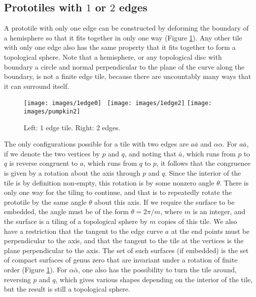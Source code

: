 \documentclass[11pt]{amsart}
\theoremstyle{remark}
\begin{document}
\subsection{Prototiles with $1$ or $2$ edges}
A prototile with only one edge can be constructed by deforming the boundary of a hemisphere so that it fits together in only one way (Figure \ref{fig:twoedge}).   Any other tile with only one edge also has the same property that it fits together to form a topological sphere.
Note that a hemisphere, or any topological disc with boundary a circle and normal perpendicular to the plane of the curve along the boundary, is not a finite edge tile, because there are uncountably many ways that it can surround itself.

\begin{figure}[h!tbp]
	\begin{center}
		\texttt{[image: images/1edge0]}  \,
		\texttt{[image: images/1edge2]}  \quad \quad \quad\quad
		\texttt{[image: images/pumpkin2]} 
		\end{center}
	\caption{Left: 1 edge tile.  Right: 2 edges. }
	\label{fig:twoedge}
\end{figure}
The only configurations possible for a tile with two edges are $a \bar a$ and $\alpha \alpha$.
For $a \bar a$, if we denote the two vertices by $p$ and $q$,  and noting that $\bar a$, which runs
from $p$ to $q$ is reverse congruent to $a$, which runs from $q$ to $p$, it follows that the congruence is given 
by a rotation about the axis through $p$ and $q$.  Since the interior of the tile is by definition non-empty, this rotation is by some nonzero angle $\theta$.  There is only one way for the tiling to continue, and that is to repeatedly
rotate the prototile by the same angle $\theta$ about this axis.  If we require the surface to be embedded,
the angle must be of the form $\theta = 2\pi/m$, where $m$ is an integer, and the surface is a tiling of a topological
sphere by $m$ copies of this tile. We also have a restriction that the tangent to the edge curve $a$ at the end points must be perpendicular to the axis, and that the tangent to the tile at the vertices is the plane perpendicular to the axis.  The set of such surfaces (if embedded) is the set of compact surfaces of genus zero that are invariant under a  rotation of finite order (Figure \ref{fig:twoedge}). For $\alpha \bar \alpha$, one also has the possibility to turn the tile around, reversing $p$ and $q$, which gives various shapes depending on the interior of the tile, but the result is still a topological sphere.
\end{document}
